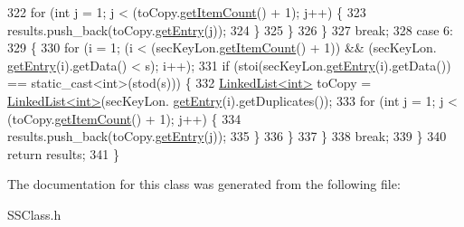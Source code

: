 \begin{DoxyCode}
322             \textcolor{keywordflow}{for} (\textcolor{keywordtype}{int} j = 1; j < (toCopy.\hyperlink{classLinkedList_afc6635f854f48f2f126cf3b60d845220}{getItemCount}() + 1); j++) \{
323                 results.push\_back(toCopy.\hyperlink{classLinkedList_a341bfd7772c9d24d29eb7a7f3936915b}{getEntry}(j));
324             \}
325         \}
326     \}
327     \textcolor{keywordflow}{break};
328     \textcolor{keywordflow}{case} 6:
329     \{
330         \textcolor{keywordflow}{for} (i = 1; (i < (secKeyLon.\hyperlink{classLinkedList_afc6635f854f48f2f126cf3b60d845220}{getItemCount}() + 1)) && (secKeyLon.
      \hyperlink{classLinkedList_a341bfd7772c9d24d29eb7a7f3936915b}{getEntry}(i).getData() < s); i++);
331         \textcolor{keywordflow}{if} (stoi(secKeyLon.\hyperlink{classLinkedList_a341bfd7772c9d24d29eb7a7f3936915b}{getEntry}(i).getData()) == static\_cast<int>(stod(s))) \{
332             \hyperlink{classLinkedList}{LinkedList<int>} toCopy = \hyperlink{classLinkedList}{LinkedList<int>}(secKeyLon.
      \hyperlink{classLinkedList_a341bfd7772c9d24d29eb7a7f3936915b}{getEntry}(i).getDuplicates());
333             \textcolor{keywordflow}{for} (\textcolor{keywordtype}{int} j = 1; j < (toCopy.\hyperlink{classLinkedList_afc6635f854f48f2f126cf3b60d845220}{getItemCount}() + 1); j++) \{
334                 results.push\_back(toCopy.\hyperlink{classLinkedList_a341bfd7772c9d24d29eb7a7f3936915b}{getEntry}(j));
335             \}
336         \}
337     \}
338     \textcolor{keywordflow}{break};
339     \}
340     \textcolor{keywordflow}{return} results;
341 \}
\end{DoxyCode}


The documentation for this class was generated from the following file\+:\begin{DoxyCompactItemize}
\item 
S\+S\+Class.\+h\end{DoxyCompactItemize}
